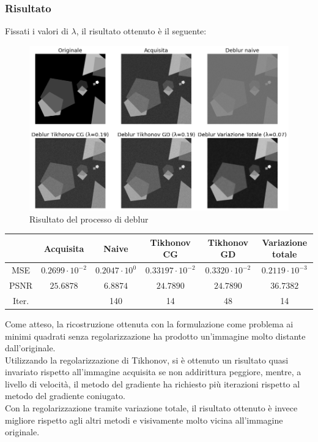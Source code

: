 \documentclass[11pt]{article}
\begin{document}
\subsubsection{Risultato}
Fissati i valori di $\lambda$, il risultato ottenuto è il seguente:\\
\begin{figure}[H]
    \centering
    \includegraphics[width=12cm]{esecuzione/1/deblur.png}
    \caption{Risultato del processo di deblur}
    \label{fig:deblur1}
\end{figure}

\begin{center}
    \begin{tabular}{ |c|c|c|c|c|c| }
    \hline
    & Acquisita & Naive & Tikhonov CG & Tikhonov GD & Variazione totale \\ 
    \hline
    MSE & $0.2699 \cdot 10^{-2}$ & $0.2047 \cdot 10^{0}$ & $0.33197 \cdot 10^{-2}$ & $0.3320 \cdot 10^{-2}$ & $0.2119 \cdot 10^{-3}$ \\ 
    PSNR & $25.6878$ & $6.8874$ & $24.7890$ & $24.7890$ & $36.7382$ \\ 
    Iter. & & 140 & 14 & 48 & 14 \\ 
    \hline
    \end{tabular}
\end{center}

Come atteso, la ricostruzione ottenuta con la formulazione come problema ai minimi quadrati senza regolarizzazione ha prodotto un'immagine molto distante dall'originale.\\
Utilizzando la regolarizzazione di Tikhonov, si è ottenuto un risultato quasi invariato rispetto all'immagine acquisita se non addirittura peggiore, mentre, a livello di velocità, il metodo del gradiente ha richiesto più iterazioni rispetto al metodo del gradiente coniugato.\\
Con la regolarizzazione tramite variazione totale, il risultato ottenuto è invece migliore rispetto agli altri metodi e visivamente molto vicina all'immagine originale.\\
\end{document}
